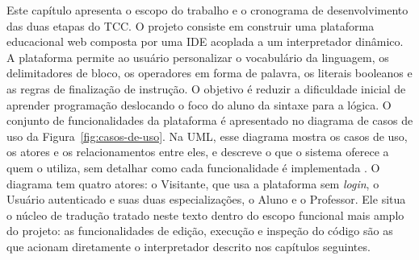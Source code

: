 
Este capítulo apresenta o escopo do trabalho e o cronograma de desenvolvimento das duas etapas do TCC. O projeto consiste em construir uma plataforma educacional web composta por uma IDE acoplada a um interpretador dinâmico. A plataforma permite ao usuário personalizar o vocabulário da linguagem, os delimitadores de bloco, os operadores em forma de palavra, os literais booleanos e as regras de finalização de instrução. O objetivo é reduzir a dificuldade inicial de aprender programação deslocando o foco do aluno da sintaxe para a lógica. O conjunto de funcionalidades da plataforma é apresentado no diagrama de casos de uso da Figura~\ref{fig:casos-de-uso}. Na UML, esse diagrama mostra os casos de uso, os atores e os relacionamentos entre eles, e descreve o que o sistema oferece a quem o utiliza, sem detalhar como cada funcionalidade é implementada \cite{booch2006uml,sommerville2018}. O diagrama tem quatro atores: o Visitante, que usa a plataforma sem \textit{login}, o Usuário autenticado e suas duas especializações, o Aluno e o Professor. Ele situa o núcleo de tradução tratado neste texto dentro do escopo funcional mais amplo do projeto: as funcionalidades de edição, execução e inspeção do código são as que acionam diretamente o interpretador descrito nos capítulos seguintes.

